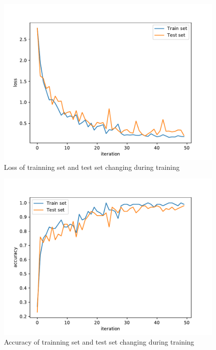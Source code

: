 \documentclass[sigchi]{acmart}
\begin{document}
\begin{figure}
  \centering
  \includegraphics[width=\linewidth]{figures/loss_nn.pdf}
  \caption{Loss of trainning set and test set changing during training}
  \label{fig:loss_nn}
\end{figure}

\begin{figure}
  \centering
  \includegraphics[width=\linewidth]{figures/accuracy_nn.pdf}
  \caption{Accuracy of trainning set and test set changing during training}
  \label{fig:accuracy_nn}
\end{figure}
\end{document}
